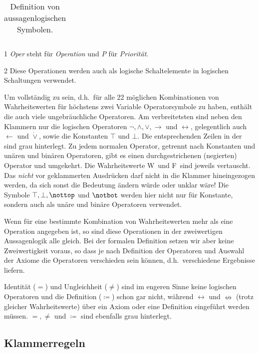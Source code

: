 \documentclass[english,ngerman,parskip=half,headsepline,footsepline]{scrreprt}
\makeatletter
\newcommand{\texttrue}{W}
\newcommand{\textfalse}{F}
\newcommand{\ltrue}{\top}      %
\newcommand{\lnfalse}{\notbot} %
\newcommand{\lfalse}{\bot}     %
\newcommand{\lntrue}{\nottop}  %
\newcommand{\lleftimp}{\operatorname{\leftarrow}}      %
\newcommand{\limp}{\operatorname{\rightarrow}}         %
\newcommand{\lequiv}{\operatorname{\leftrightarrow}}   %
\newcommand{\lnequiv}{\operatorname{\nleftrightarrow}} %
\newcommand{\lxor}{\operatorname{\dot{\lor}}}          %
\newcommand{\defeq}{\coloneqq}
\newcommand{\textdh}{d.\@ h.\@}
\makeatother
\begin{document}
\begin{table}
\begin{threeparttable}
\begin{tabularx}{\linewidth}{c||c:cc:cccc|X:X|c|}
				\hline %
			\end{tabularx}
			\caption{Definition von aussagenlogischen Symbolen.}
			\label{tab:Symbole}
			\begin{tablenotes}
				\item[1] \emph{Oper} steht für \emph{Operation} und \emph{P} für \emph{Priorität}.
				\item[2] Diese Operationen werden auch als logische Schaltelemente in logischen Schaltungen verwendet.
			\end{tablenotes}
		\end{threeparttable}
	\end{table}

	Um vollständig zu sein, \textdh\ für alle 22 möglichen Kombinationen von Wahrheitswerten für höchstens zwei Variable Operatorsymbole zu haben, enthält die \tablename auch viele ungebräuchliche Operatoren. Am verbreitetsten sind neben den Klammern nur die logischen Operatoren $\lnot, \land, \lor, \limp$ und $\lequiv$, gelegentlich auch $\lleftimp$ und $\lxor$, sowie die Konstanten $\ltrue$ und $\lfalse$. Die entsprechenden Zeilen in der \tablename sind grau hinterlegt. Zu jedem normalen Operator, getrennt nach Konstanten und unären und binären Operatoren, gibt es einen durchgestrichenen (negierten) Operator und umgekehrt. Die Wahrheitswerte \texttrue\ und \textfalse\ sind jeweils vertauscht. Das \emph{nicht} vor geklammerten Ausdrücken darf nicht in die Klammer hineingezogen werden, da sich sonst die Bedeutung ändern würde oder unklar wäre! Die Symbole $\ltrue, \lfalse, \lntrue$ und $\lnfalse$ werden hier nicht nur für Konstante, sondern auch als unäre und binäre Operatoren verwendet.

	Wenn für eine bestimmte Kombination von Wahrheitswerten mehr als eine Operation angegeben ist, so sind diese Operationen in der zweiwertigen Aussagenlogik alle gleich. Bei der formalen Definition setzen wir aber keine Zweiwertigkeit voraus, so dass je nach Definition der Operatoren und Auswahl der Axiome die Operatoren verschieden sein können, \textdh\ verschiedene Ergebnisse liefern.

	Identität ($=$) und Ungleichheit  ($\ne$) sind im engeren Sinne keine logischen Operatoren und die Definition ($\defeq$) schon gar nicht, während $\lequiv$ und $\lnequiv$ (trotz gleicher Wahrheitswerte) über ein Axiom oder eine Definition eingeführt werden müssen. $=, \ne$ und $\defeq$ sind ebenfalls grau hinterlegt.

	\subsection{Klammerregeln}
	\label{sub:Klammerregeln}
\end{document}
